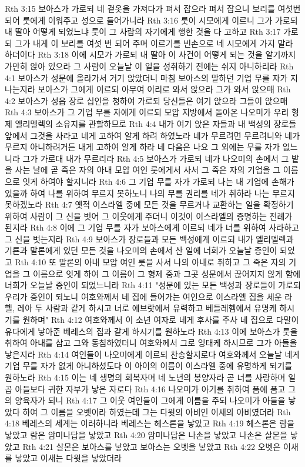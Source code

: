 Rth 3:15  보아스가 가로되 네 겉옷을 가져다가 펴서 잡으라 펴서 잡으니 보리를 여섯번 되어 룻에게 이워주고 성으로 들어가니라
Rth 3:16  룻이 시모에게 이르니 그가 가로되 내 딸아 어떻게 되었느냐 룻이 그 사람의 자기에게 행한 것을 다 고하고
Rth 3:17  가로되 그가 내게 이 보리를 여섯 번 되어 주며 이르기를 빈손으로 네 시모에게 가지 말라 하더이다
Rth 3:18  이에 시모가 가로되 내 딸아 이 사건이 어떻게 되는 것을 알기까지 가만히 앉아 있으라 그 사람이 오늘날 이 일을 성취하기 전에는 쉬지 아니하리라
Rth 4:1  보아스가 성문에 올라가서 거기 앉았더니 마침 보아스의 말하던 기업 무를 자가 지나는지라 보아스가 그에게 이르되 아무여 이리로 와서 앉으라 그가 와서 앉으매
Rth 4:2  보아스가 성읍 장로 십인을 청하여 가로되 당신들은 여기 앉으라 그들이 앉으매
Rth 4:3  보아스가 그 기업 무를 자에게 이르되 모압 지방에서 돌아온 나오미가 우리 형제 엘리멜렉의 소유지를 관할하므로
Rth 4:4  내가 여기 앉은 자들과 내 백성의 장로들 앞에서 그것을 사라고 네게 고하여 알게 하려 하였노라 네가 무르려면 무르려니와 네가 무르지 아니하려거든 내게 고하여 알게 하라 네 다음은 나요 그 외에는 무를 자가 없느니라 그가 가로대 내가 무르리라
Rth 4:5  보아스가 가로되 네가 나오미의 손에서 그 밭을 사는 날에 곧 죽은 자의 아내 모압 여인 룻에게서 사서 그 죽은 자의 기업을 그 이름으로 잇게 하여야 할지니라
Rth 4:6  그 기업 무를 자가 가로되 나는 내 기업에 손해가 있을까 하여 나를 위하여 무르지 못하노니 나의 무를 권리를 네가 취하라 나는 무르지 못하겠노라
Rth 4:7  옛적 이스라엘 중에 모든 것을 무르거나 교환하는 일을 확정하기 위하여 사람이 그 신을 벗어 그 이웃에게 주더니 이것이 이스라엘의 증명하는 전례가 된지라
Rth 4:8  이에 그 기업 무를 자가 보아스에게 이르되 네가 너를 위하여 사라하고 그 신을 벗는지라
Rth 4:9  보아스가 장로들과 모든 백성에게 이르되 내가 엘리멜렉과 기룐과 말론에게 있던 모든 것을 나오미의 손에서 산 일에 너희가 오늘날 증인이 되었고
Rth 4:10  또 말론의 아내 모압 여인 룻을 사서 나의 아내로 취하고 그 죽은 자의 기업을 그 이름으로 잇게 하여 그 이름이 그 형제 중과 그곳 성문에서 끊어지지 않게 함에 너희가 오늘날 증인이 되었느니라
Rth 4:11  "성문에 있는 모든 백성과 장로들이 가로되 우리가 증인이 되노니 여호와께서 네 집에 들어가는 여인으로 이스라엘 집을 세운 라헬, 레아 두 사람과 같게 하시고 너로 에브랏에서 유력하고 베들레헴에서 유명케 하시기를 원하며"
Rth 4:12  여호와께서 이 소년 여자로 네게 후사를 주사 네 집으로 다말이 유다에게 낳아준 베레스의 집과 같게 하시기를 원하노라
Rth 4:13  이에 보아스가 룻을 취하여 아내를 삼고 그와 동침하였더니 여호와께서 그로 잉태케 하시므로 그가 아들을 낳은지라
Rth 4:14  여인들이 나오미에게 이르되 찬송할지로다 여호와께서 오늘날 네게 기업 무를 자가 없게 아니하셨도다 이 아이의 이름이 이스라엘 중에 유명하게 되기를 원하노라
Rth 4:15  이는 네 생명의 회복자며 네 노년의 봉양자라 곧 너를 사랑하며 일곱 아들보다 귀한 자부가 낳은 자로다
Rth 4:16  나오미가 아기를 취하여 품에 품고 그의 양육자가 되니
Rth 4:17  그 이웃 여인들이 그에게 이름을 주되 나오미가 아들을 낳았다 하여 그 이름을 오벳이라 하였는데 그는 다윗의 아비인 이새의 아비였더라
Rth 4:18  베레스의 세계는 이러하니라 베레스는 헤스론을 낳았고
Rth 4:19  헤스론은 람을 낳았고 람은 암미나답을 낳았고
Rth 4:20  암미나답은 나손을 낳았고 나손은 살몬을 낳았고
Rth 4:21  살몬은 보아스를 낳았고 보아스는 오벳을 낳았고
Rth 4:22  오벳은 이새를 낳았고 이새는 다윗을 낳았더라


